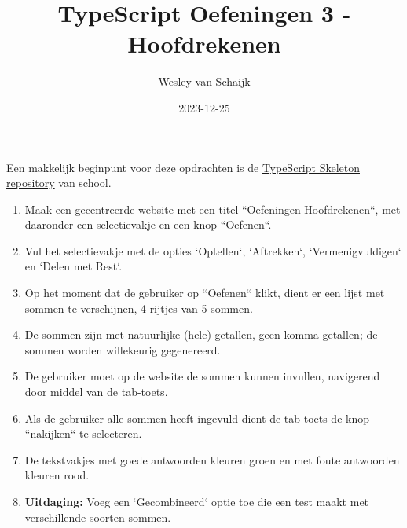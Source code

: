 \documentclass{article}
\title{TypeScript Oefeningen 3 - Hoofdrekenen}
\author{Wesley van Schaijk}
\date{2023-12-25}
\begin{document}
\maketitle

\paragraph{}
Een makkelijk beginpunt voor deze opdrachten is de \href{https://github.com/HZ-HBO-ICT/ts-skeleton-app}{TypeScript Skeleton repository} van school.

\begin{enumerate}
	\item Maak een gecentreerde website met een titel ``Oefeningen Hoofdrekenen``, met daaronder een selectievakje en een knop ``Oefenen``.
	\item Vul het selectievakje met de opties `Optellen`, `Aftrekken`, `Vermenigvuldigen` en `Delen met Rest`.
	\item Op het moment dat de gebruiker op ``Oefenen`` klikt, dient er een lijst met sommen te verschijnen, 4 rijtjes van 5 sommen.
	\item De sommen zijn met natuurlijke (hele) getallen, geen komma getallen; de sommen worden willekeurig gegenereerd.
	\item De gebruiker moet op de website de sommen kunnen invullen, navigerend door middel van de tab-toets.
	\item Als de gebruiker alle sommen heeft ingevuld dient de tab toets de knop ``nakijken`` te selecteren.
	\item De tekstvakjes met goede antwoorden kleuren groen en met foute antwoorden kleuren rood.
	\item \textbf{Uitdaging:} Voeg een `Gecombineerd` optie toe die een test maakt met verschillende soorten sommen.
\end{enumerate}
\end{document}
